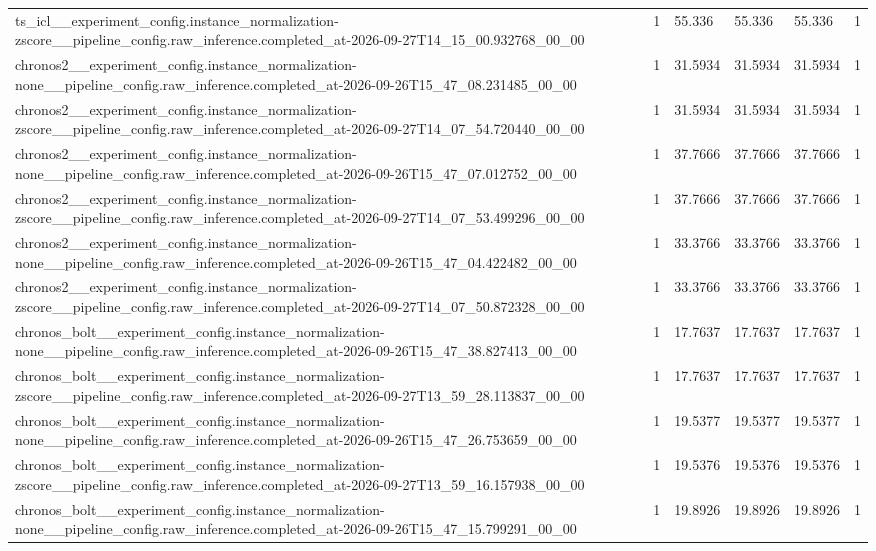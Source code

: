 \begin{tabular}{llllll}
ts\_icl\_\_experiment\_config.instance\_normalization-zscore\_\_pipeline\_config.raw\_inference.completed\_at-2026-09-27T14\_15\_00.932768\_00\_00 & 1 & 55.336 & 55.336 & 55.336 & 1 \\
chronos2\_\_experiment\_config.instance\_normalization-none\_\_pipeline\_config.raw\_inference.completed\_at-2026-09-26T15\_47\_08.231485\_00\_00 & 1 & 31.5934 & 31.5934 & 31.5934 & 1 \\
chronos2\_\_experiment\_config.instance\_normalization-zscore\_\_pipeline\_config.raw\_inference.completed\_at-2026-09-27T14\_07\_54.720440\_00\_00 & 1 & 31.5934 & 31.5934 & 31.5934 & 1 \\
chronos2\_\_experiment\_config.instance\_normalization-none\_\_pipeline\_config.raw\_inference.completed\_at-2026-09-26T15\_47\_07.012752\_00\_00 & 1 & 37.7666 & 37.7666 & 37.7666 & 1 \\
chronos2\_\_experiment\_config.instance\_normalization-zscore\_\_pipeline\_config.raw\_inference.completed\_at-2026-09-27T14\_07\_53.499296\_00\_00 & 1 & 37.7666 & 37.7666 & 37.7666 & 1 \\
chronos2\_\_experiment\_config.instance\_normalization-none\_\_pipeline\_config.raw\_inference.completed\_at-2026-09-26T15\_47\_04.422482\_00\_00 & 1 & 33.3766 & 33.3766 & 33.3766 & 1 \\
chronos2\_\_experiment\_config.instance\_normalization-zscore\_\_pipeline\_config.raw\_inference.completed\_at-2026-09-27T14\_07\_50.872328\_00\_00 & 1 & 33.3766 & 33.3766 & 33.3766 & 1 \\
chronos\_bolt\_\_experiment\_config.instance\_normalization-none\_\_pipeline\_config.raw\_inference.completed\_at-2026-09-26T15\_47\_38.827413\_00\_00 & 1 & 17.7637 & 17.7637 & 17.7637 & 1 \\
chronos\_bolt\_\_experiment\_config.instance\_normalization-zscore\_\_pipeline\_config.raw\_inference.completed\_at-2026-09-27T13\_59\_28.113837\_00\_00 & 1 & 17.7637 & 17.7637 & 17.7637 & 1 \\
chronos\_bolt\_\_experiment\_config.instance\_normalization-none\_\_pipeline\_config.raw\_inference.completed\_at-2026-09-26T15\_47\_26.753659\_00\_00 & 1 & 19.5377 & 19.5377 & 19.5377 & 1 \\
chronos\_bolt\_\_experiment\_config.instance\_normalization-zscore\_\_pipeline\_config.raw\_inference.completed\_at-2026-09-27T13\_59\_16.157938\_00\_00 & 1 & 19.5376 & 19.5376 & 19.5376 & 1 \\
chronos\_bolt\_\_experiment\_config.instance\_normalization-none\_\_pipeline\_config.raw\_inference.completed\_at-2026-09-26T15\_47\_15.799291\_00\_00 & 1 & 19.8926 & 19.8926 & 19.8926 & 1 \\

\end{tabular}
